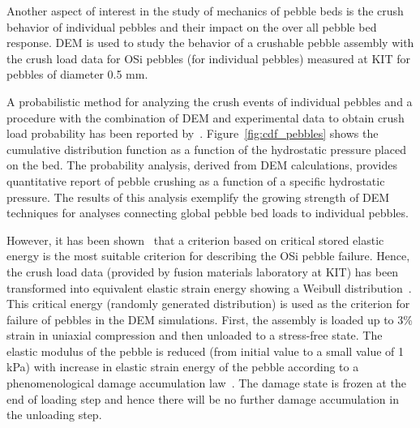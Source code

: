 Another aspect of interest in the study of mechanics of pebble beds is the crush behavior of individual pebbles and their impact on the over all pebble bed response. DEM is used to study the behavior of a crushable pebble assembly with the crush load data for OSi pebbles (for individual pebbles) measured at KIT for pebbles of diameter 0.5 mm. 

A probabilistic method for analyzing the crush events of individual pebbles and a procedure with the combination of DEM and experimental data to obtain crush load probability has been reported by~\cite{Gan:2010kc}. Figure~\ref{fig:cdf_pebbles} shows the cumulative distribution function as a function of the hydrostatic pressure placed on the bed. The probability analysis, derived from DEM calculations, provides quantitative report of pebble crushing as a function of a specific hydrostatic pressure. The results of this analysis exemplify the growing strength of DEM techniques for analyses connecting global pebble bed loads to individual pebbles.

However, it has been shown~\cite{Zhao2010,Zhao2011} that a criterion based on critical stored elastic energy is the most suitable criterion for describing the OSi pebble failure. Hence, the crush load data (provided by fusion materials laboratory at KIT) has been transformed into equivalent elastic strain energy showing a Weibull distribution~\cite{Zhao2010}. This critical energy (randomly generated distribution) is used as the criterion for failure of pebbles in the DEM simulations. First, the assembly is loaded up to 3\% strain in uniaxial compression and then unloaded to a stress-free state. The elastic modulus of the pebble is reduced (from initial value to a small value of 1 kPa) with increase in elastic strain energy of the pebble according to a phenomenological damage accumulation law~\cite{Annabattula2011b}. The damage state is frozen at the end of loading step and hence there will be no further damage accumulation in the unloading step. 

